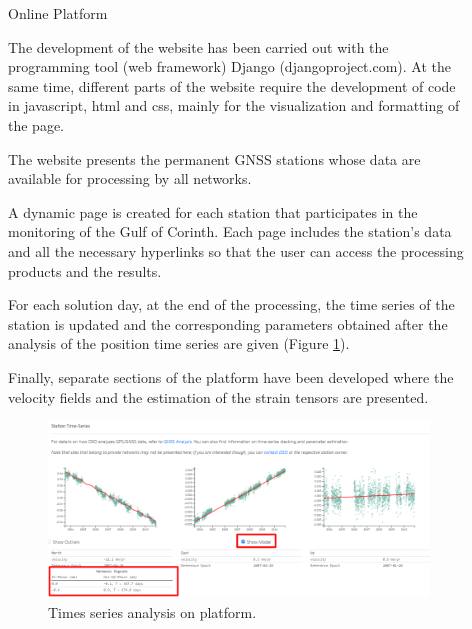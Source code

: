 \documentclass[final,a0,portrait]{beamer}
\newlength{\sepwid}
\newlength{\onecolwid}
\begin{document}
\begin{frame}[t]
\begin{columns}[t]
\begin{column}{\onecolwid}
\end{column} %

\begin{column}{\sepwid}\end{column} %


\begin{column}{\onecolwid} %


\begin{block}{Online Platform}
{\small
The development of the website has been carried out with the programming tool (web framework) Django (djangoproject.com). At the same time, different parts of the website require the development of code in javascript, html and css, mainly for the visualization and formatting of the page.

The website presents the permanent GNSS stations whose data are available for processing by all networks.

A dynamic page is created for each station that participates in the monitoring of the Gulf of Corinth. Each page includes the station's data and all the necessary hyperlinks so that the user can access the processing products and the results.

For each solution day, at the end of the processing, the time series of the station is updated and the corresponding parameters obtained after the analysis of the position time series are given (Figure \ref{fig:vels}).

Finally, separate sections of the platform have been developed where the velocity fields and the estimation of the strain tensors are presented.

}

\begin{figure}
    \includegraphics[width=1\onecolwid]{gsg2022_ts1.png}
    \caption{Times series analysis on platform.}
    \label{fig:vels}
\end{figure}


\end{block}
\end{column}
\end{columns}
\end{frame}
\end{document}
